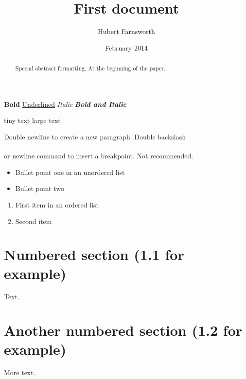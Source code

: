 \documentclass[12pt, a4paper]{article} %
\title{First document}
\author{Hubert Farnsworth}
\date{February 2014} %
\begin{document}



\maketitle %



\tableofcontents %



\textbf{Bold}
\underline{Underlined} 
\textit{Italic}
\textbf{\textit{Bold and Italic}}

{\tiny tiny text}
{\LARGE large text}

Double newline to create a new paragraph.
Double backslash \\\\ or newline command to insert a breakpoint. Not recommended.



\begin{itemize}
  \item Bullet point one in an unordered list
  \item Bullet point two
\end{itemize}

\begin{enumerate}
  \item First item in an ordered list
  \item Second item
\end{enumerate}



\begin{abstract}
Special abstract formatting. At the beginning of the paper.
\end{abstract}

\section{Numbered section (1.1 for example)}
 
Text.
 
\section{Another numbered section (1.2 for example)}

More text.
 
\end{document}
